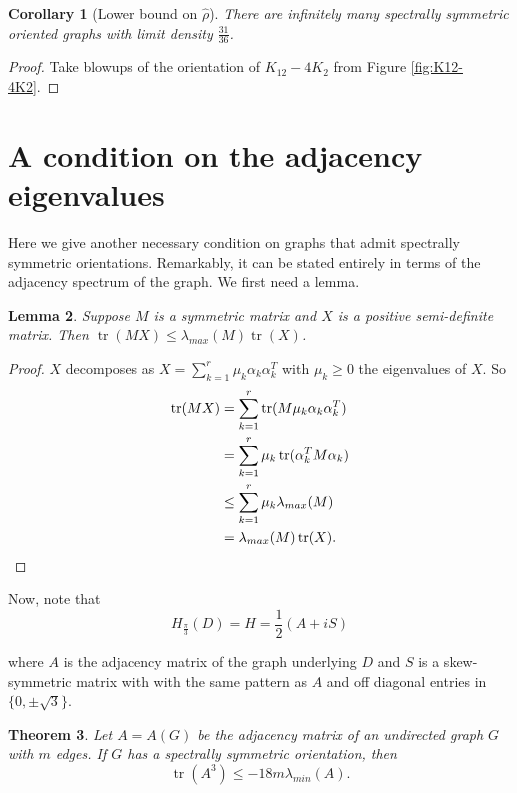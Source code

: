 \documentclass[11pt]{article}
\theoremstyle{plain}
\newtheorem{theorem}{Theorem}[section]
\newtheorem{lemma}[theorem]{Lemma}
\newtheorem{corollary}[theorem]{Corollary}
\DeclareMathOperator{\tr}{tr}
\newcommand{\ssym}[0]{spectrally symmetric }
\newcommand{\Hs}[0]{H_{\frac{\pi}{3}}}
\begin{document}
\begin{corollary}[Lower bound on $\widehat{\rho}$] \label{Cor:lower_density_bound}
    There are infinitely many \ssym oriented graphs with limit density $\frac{31}{36}$.
\end{corollary}

\begin{proof}
    Take blowups of the orientation of $K_{12}-4K_2$ from Figure \ref{fig:K12-4K2}.
\end{proof}




\section{A condition on the adjacency eigenvalues} \label{Sec:A_eigenvalues}

Here we give another necessary condition on graphs that admit \ssym orientations. Remarkably, it can be stated entirely in terms of the adjacency spectrum of the graph. We first need a lemma.

\begin{lemma} \label{Lem:Trace_PSD_ineqality} 
    Suppose $M$ is a symmetric matrix and $X$ is a positive semi-definite matrix. Then $\tr(MX)\leq\lambda_{max}(M)\tr(X)$.
\end{lemma}

\begin{proof}
    $X$ decomposes as $X=\sum_{k=1}^r\mu_k\alpha_k\alpha_k^T$ with $\mu_k\geq0$ the eigenvalues of $X$. So 
    \begin{align*} \tr(MX)&=\sum_{k=1}^r\tr(M\mu_k\alpha_k\alpha_k^T)\\&=\sum_{k=1}^r\mu_k\tr(\alpha_k^TM\alpha_k)\\&\leq\sum_{k=1}^r\mu_k\lambda_{max}(M)\\&=\lambda_{max}(M)\tr(X). \qedhere
    \end{align*} 
\end{proof}


Now, note that 
\begin{equation}
    \Hs(D)=H=\frac{1}{2}(A+iS) \label{Eq:HAS}
\end{equation} 

\noindent where $A$ is the adjacency matrix of the graph underlying $D$ and $S$ is a skew-symmetric matrix with with the same pattern as $A$ and off diagonal entries in $\{0,\pm\sqrt{3}\}.$


\begin{theorem} \label{Thm:Tr_A^3_min_eval}
Let $A=A(G)$ be the adjacency matrix of an undirected graph $G$ with $m$ edges. If $G$ has a \ssym orientation, then \[\tr(A^3)\le-18m\lambda_{min}(A).\]
\end{theorem}
\end{document}
